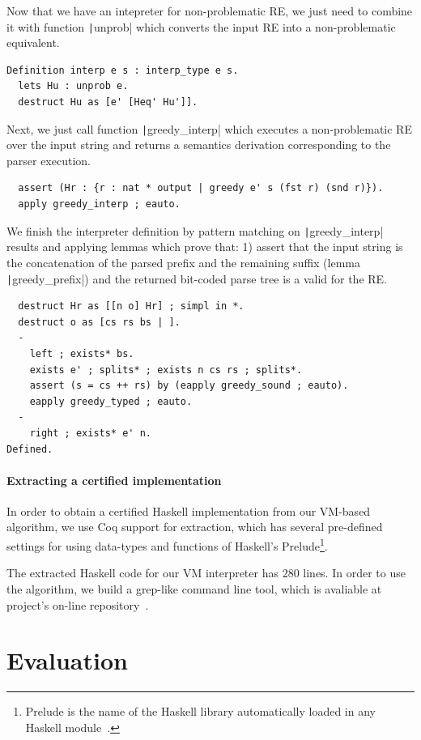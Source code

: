 \documentclass[review]{elsarticle}
\newcommand{\coq}[1]{\texttt|#1|}
\theoremstyle{definition}
\begin{document}
Now that we have an intepreter for non-problematic RE, we just need to combine
it with function \coq{unprob} which converts the input RE into 
a non-problematic equivalent. 
\begin{verbatim}
Definition interp e s : interp_type e s.
  lets Hu : unprob e.
  destruct Hu as [e' [Heq' Hu']].
\end{verbatim}
Next, we just call function \coq{greedy_interp} which executes a non-problematic
RE over the input string and returns a semantics derivation corresponding to 
the parser execution. 
\begin{verbatim}
  assert (Hr : {r : nat * output | greedy e' s (fst r) (snd r)}).
  apply greedy_interp ; eauto.
\end{verbatim}
We finish the interpreter definition by pattern matching on \coq{greedy_interp}
results and applying lemmas which prove that: 1) assert that the input string is
the concatenation of the parsed prefix and the remaining suffix (lemma
\coq{greedy_prefix}) and the returned bit-coded parse tree is a valid for the 
RE.
\begin{verbatim}
  destruct Hr as [[n o] Hr] ; simpl in *.
  destruct o as [cs rs bs | ].
  -
    left ; exists* bs.
    exists e' ; splits* ; exists n cs rs ; splits*.
    assert (s = cs ++ rs) by (eapply greedy_sound ; eauto).
    eapply greedy_typed ; eauto.
  -
    right ; exists* e' n.
Defined.
\end{verbatim}


\paragraph{Extracting a certified implementation}

In order to obtain a certified Haskell implementation from our VM-based algorithm,
we use Coq support for extraction, which has several pre-defined
settings for using data-types and functions of Haskell's
Prelude\footnote{Prelude is the name of the Haskell library automatically loaded
in any Haskell module~\cite{Haskell98}.}.

The extracted Haskell code for our VM interpreter has 280 lines. In order to use 
the algorithm, we build a grep-like command line tool, which is avaliable at 
project's on-line repository~\cite{regexvm-rep}. 

\section{Evaluation}\label{section:experiments}
\end{document}
